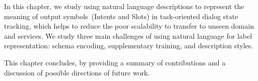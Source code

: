  In this
chapter, we study using natural language descriptions to represent the
meaning of output symbols~(Intents and Slots) in task-oriented dialog
state tracking, which helps to reduce the poor scalability to transfer
to unseen domain and services. We study three main challenges of using
natural language for label representation: schema encoding,
supplementary training, and description styles.


 This chapter
concludes, by providing a summary of contributions and a discussion of
possible directions of future work.


